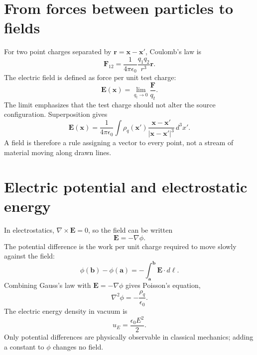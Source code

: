 \documentclass[11pt]{article}
\begin{document}
\section{From forces between particles to fields}

For two point charges separated by $\mathbf r=\mathbf x-\mathbf x'$, Coulomb's law is
\begin{equation}
\mathbf F_{12}=\frac{1}{4\pi\epsilon_0}\frac{q_1q_2}{r^3}\mathbf r.
\end{equation}
The electric field is defined as force per unit test charge:
\begin{equation}
\mathbf E(\mathbf x)=\lim_{q_t\rightarrow0}\frac{\mathbf F}{q_t}.
\end{equation}
The limit emphasizes that the test charge should not alter the source configuration. Superposition gives
\begin{equation}
\mathbf E(\mathbf x)=\frac{1}{4\pi\epsilon_0}\int
\rho_q(\mathbf x')\frac{\mathbf x-\mathbf x'}{|\mathbf x-\mathbf x'|^3}\,d^3x'.
\end{equation}
A field is therefore a rule assigning a vector to every point, not a stream of material moving along drawn lines.


\section{Electric potential and electrostatic energy}

In electrostatics, $\nabla\times\mathbf E=0$, so the field can be written
\begin{equation}
\mathbf E=-\nabla\phi.
\end{equation}
The potential difference is the work per unit charge required to move slowly against the field:
\begin{equation}
\phi(\mathbf b)-\phi(\mathbf a)=-\int_{\mathbf a}^{\mathbf b}\mathbf E\cdot d\boldsymbol\ell.
\end{equation}
Combining Gauss's law with $\mathbf E=-\nabla\phi$ gives Poisson's equation,
\begin{equation}
\nabla^2\phi=-\frac{\rho_q}{\epsilon_0}.
\end{equation}
The electric energy density in vacuum is
\begin{equation}
u_E=\frac{\epsilon_0E^2}{2}.
\end{equation}
Only potential differences are physically observable in classical mechanics; adding a constant to $\phi$ changes no field.
\end{document}

